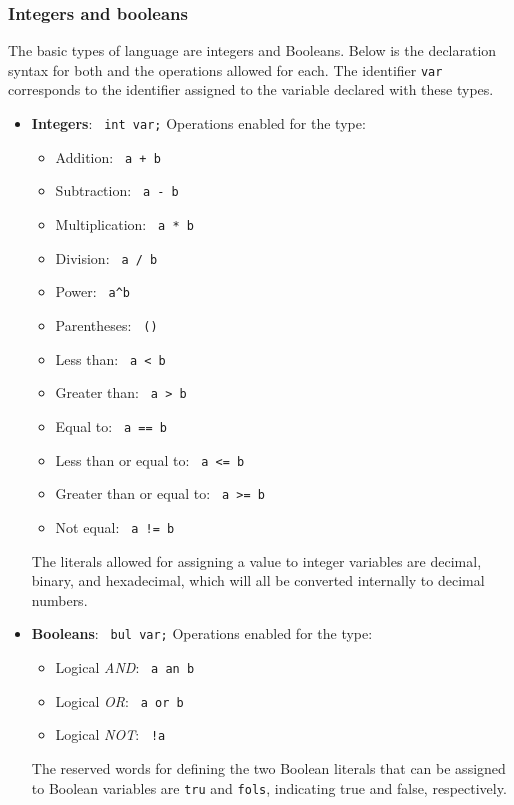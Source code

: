 \documentclass[10pt,a4paper]{article}
\begin{document}
\subsubsection{Integers and booleans}
The basic types of language are integers and Booleans. Below is the declaration syntax for both and the operations allowed for each. The identifier \texttt{var} corresponds to the identifier assigned to the variable declared with these types.
\begin{itemize}
    \item \textbf{Integers}: \texttt{\color{blue} int var;}
    Operations enabled for the type:
    \begin{itemize}
        \item Addition: \texttt{\color{blue} a + b}
        \item Subtraction: \texttt{\color{blue} a - b}
        \item Multiplication: \texttt{\color{blue} a * b}
        \item Division: \texttt{\color{blue} a / b}
        \item Power: \texttt{\color{blue} a\^{}b}
        \item Parentheses: \texttt{\color{blue} ()}
        \item Less than: \texttt{\color{blue} a \textless{} b}
        \item Greater than: \texttt{\color{blue} a \textgreater{} b}
        \item Equal to: \texttt{\color{blue} a == b}        
        \item Less than or equal to: \texttt{\color{blue} a \textless{}= b}
        \item Greater than or equal to: \texttt{\color{blue} a \textgreater{}= b}
        \item Not equal: \texttt{\color{blue} a != b}
    \end{itemize}
    
    The literals allowed for assigning a value to integer variables are decimal, binary, and hexadecimal, which will all be converted internally to decimal numbers.
    \item \textbf{Booleans}: \texttt{\color{blue} bul var;}
    Operations enabled for the type:
    \begin{itemize}
        \item Logical \textit{AND}: \texttt{\color{blue} a an b}
        \item Logical \textit{OR}: \texttt{\color{blue} a or b}
        \item Logical \textit{NOT}: \texttt{\color{blue} !a}
    \end{itemize}
    
    The reserved words for defining the two Boolean literals that can be assigned to Boolean variables are \texttt{\color{blue}tru} and \texttt{\color{blue}fols}, indicating true and false, respectively.
\end{itemize}
\end{document}
